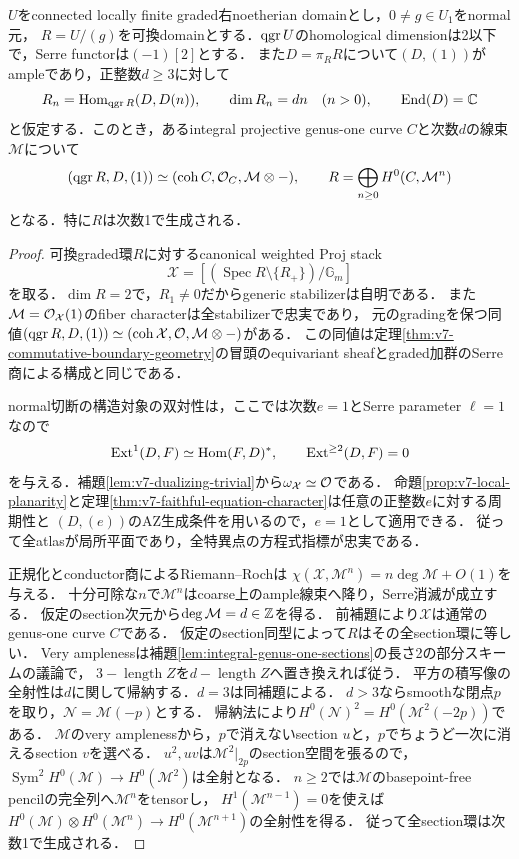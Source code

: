 \documentclass[11pt,a4paper]{ltjsarticle}
\begin{document}
\begin{lemma}[一次normal切断の可換な反標準境界]
\label{lem:v8-degree-one-commutative-boundary}
$U$をconnected locally finite graded右noetherian domainとし，$0\ne g\in U_1$をnormal元，
$R=U/(g)$を可換domainとする．$\operatorname{qgr} U$のhomological dimensionは2以下で，Serre functorは$(-1)[2]$とする．
また$D=\pi_RR$について$(D,(1))$がampleであり，正整数$d\geq3$に対して
\[
 R_n=\operatorname{Hom}_{\operatorname{qgr} R}(D,D(n)),\qquad\dim R_n=dn\quad(n>0),
 \qquad\operatorname{End}(D)=\mathbb C
\]
と仮定する．このとき，あるintegral projective genus-one curve $C$と次数$d$の線束$\mathcal M$について
\[
 (\operatorname{qgr} R,D,(1))\simeq(\operatorname{coh} C,\mathcal O_C,\mathcal M\otimes-),
 \qquad R=\bigoplus_{n\geq0}H^0(C,\mathcal M^n)
\]
となる．特に$R$は次数1で生成される．
\end{lemma}
\begin{proof}
可換graded環$R$に対するcanonical weighted Proj stack
\[
 \mathcal X=[(\operatorname{Spec}R\setminus\{R_+\})/\mathbb G_m]
\]
を取る．$\dim R=2$で，$R_1\ne0$だからgeneric stabilizerは自明である．
また$\mathcal M=\mathcal O_{\mathcal X}(1)$のfiber characterは全stabilizerで忠実であり，
元のgradingを保つ同値$(\operatorname{qgr} R,D,(1))\simeq(\operatorname{coh}\mathcal X,\mathcal O,\mathcal M\otimes-)$がある．
この同値は定理\ref{thm:v7-commutative-boundary-geometry}の冒頭のequivariant sheafとgraded加群のSerre商による構成と同じである．

normal切断の構造対象の双対性は，ここでは次数$e=1$とSerre parameter $\ell=1$なので
\[
 \operatorname{Ext}^1(D,F)\simeq\operatorname{Hom}(F,D)^*,\qquad\operatorname{Ext}^{\geq2}(D,F)=0
\]
を与える．補題\ref{lem:v7-dualizing-trivial}から$\omega_{\mathcal X}\simeq\mathcal O$である．
命題\ref{prop:v7-local-planarity}と定理\ref{thm:v7-faithful-equation-character}は任意の正整数$e$に対する周期性と
$(D,(e))$のAZ生成条件を用いるので，$e=1$として適用できる．
従って全atlasが局所平面であり，全特異点の方程式指標が忠実である．

正規化とconductor商によるRiemann--Rochは
$\chi(\mathcal X,\mathcal M^n)=n\deg\mathcal M+O(1)$を与える．
十分可除な$n$で$\mathcal M^n$はcoarse上のample線束へ降り，Serre消滅が成立する．
仮定のsection次元から$\deg\mathcal M=d\in\mathbb Z$を得る．
前補題により$\mathcal X$は通常のgenus-one curve $C$である．
仮定のsection同型によって$R$はその全section環に等しい．
Very amplenessは補題\ref{lem:integral-genus-one-sections}の長さ2の部分スキームの議論で，
$3-\operatorname{length}Z$を$d-\operatorname{length}Z$へ置き換えれば従う．
平方の積写像の全射性は$d$に関して帰納する．$d=3$は同補題による．
$d>3$ならsmoothな閉点$p$を取り，$\mathcal N=\mathcal M(-p)$とする．
帰納法により$H^0(\mathcal N)^2=H^0(\mathcal M^2(-2p))$である．
$\mathcal M$のvery amplenessから，$p$で消えないsection $u$と，$p$でちょうど一次に消えるsection $v$を選べる．
$u^2,uv$は$\mathcal M^2|_{2p}$のsection空間を張るので，
$\operatorname{Sym}^2H^0(\mathcal M)\to H^0(\mathcal M^2)$は全射となる．
$n\geq2$では$\mathcal M$のbasepoint-free pencilの完全列へ$\mathcal M^n$をtensorし，
$H^1(\mathcal M^{n-1})=0$を使えば
$H^0(\mathcal M)\otimes H^0(\mathcal M^n)\to H^0(\mathcal M^{n+1})$の全射性を得る．
従って全section環は次数1で生成される．
\end{proof}
\end{document}
